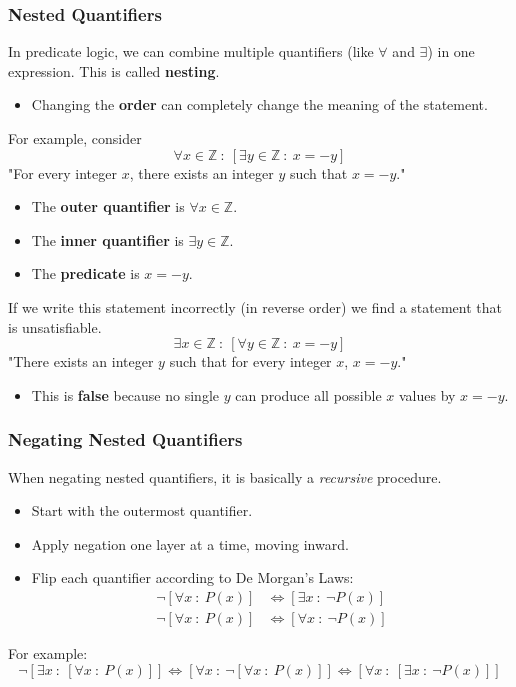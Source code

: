 \documentclass[10pt]{article}
\begin{document}
\subsubsection*{Nested Quantifiers}
In predicate logic, we can combine multiple quantifiers (like $\forall$ and $\exists$) in one expression.  This is called \textbf{nesting}.
\begin{itemize}
	\item Changing the \textbf{order} can completely change the meaning of the statement.
\end{itemize}
For example, consider
\[\forall x \in \mathbb{Z} \::\: [\exists y \in \mathbb{Z} \::\: x = -y]\]
"For every integer $x$, there exists an integer $y$ such that $x = -y$."
\begin{itemize}
	\item The \textbf{outer quantifier} is $\forall x \in \mathbb{Z}$.
	\item The \textbf{inner quantifier} is $\exists y \in \mathbb{Z}$.
	\item The \textbf{predicate} is $x = -y$.
\end{itemize}
If we write this statement incorrectly (in reverse order) we find a statement that is unsatisfiable.
\[\exists x \in \mathbb{Z} \::\: [\forall y \in \mathbb{Z} \::\: x = -y]\]
"There exists an integer $y$ such that for every integer $x$, $x = -y$."
\begin{itemize}
	\item This is \textbf{false} because no single $y$ can produce all possible $x$ values by $x = -y$.
\end{itemize}

\subsubsection*{Negating Nested Quantifiers}
When negating nested quantifiers, it is basically a \textit{recursive} procedure.
\begin{itemize}
	\item Start with the outermost quantifier.
	\item Apply negation one layer at a time, moving inward.
	\item Flip each quantifier according to De Morgan's Laws:
	\begin{align*}
        \neg [\forall x \::\: P(x)] &\Leftrightarrow [\exists x \::\: \neg P(x)]\\
        \neg [\forall x \::\: P(x)] &\Leftrightarrow [\forall x \::\: \neg P(x)]
    \end{align*}
\end{itemize}
For example:
\[\neg [ \exists x \::\: [\forall x \::\: P(x)]] \Leftrightarrow [\forall x \::\: \neg [\forall x \::\: P(x)]] \Leftrightarrow [\forall x \::\: [\exists x \::\: \neg P(x)]]\]
\end{document}
